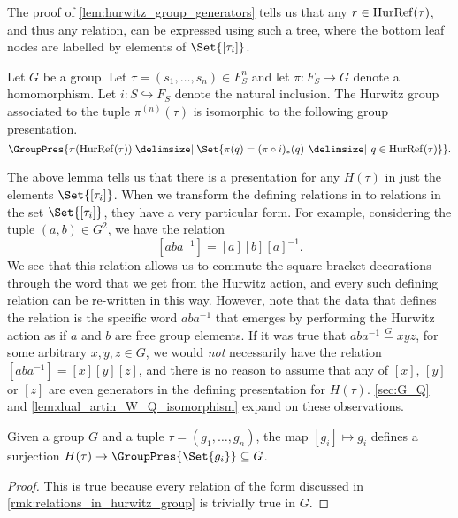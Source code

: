 The proof of \cref{lem:hurwitz_group_generators} tells us that any $r \in \operatorname{HurRef}(\tau)$, and thus any relation, can be expressed using such a tree, where the bottom leaf nodes are labelled by elements of  $\Set{[\tau_i]}$.

\begin{lemma}
	\label{lem:hurwitz_group_alt_presentation}
	Let $G$ be a group.
	Let $\tau = (s_1,\ldots,s_n) \in F_S^n$ and let $\pi \colon F_S \to G$ denote a homomorphism.
	Let $i \colon S \hookrightarrow F_S$ denote the natural inclusion.
	The Hurwitz group associated to the tuple $\pi^{(n)}(\tau)$ is isomorphic to the following group presentation.
	\[
		\GroupPres{\pi(\hurref(\tau)) \relations \Set{\pi(q) = (\pi \circ i)_*(q) \given q \in \hurref(\tau)}}
		.\]
\end{lemma}


\begin{remark}
	\label{rmk:relations_in_hurwitz_group}
	The above lemma tells us that there is a presentation for any $H(\tau)$ in just the elements $\Set{[\tau_i]} $.
	When we transform the defining relations in to relations in the set $\Set{[\tau_i]} $, they have a very particular form.
	For example, considering the tuple $(a,b) \in G^2$, we have the relation
	\[
		[aba^{-1}]=[a][b][a]^{-1}
		.\]
	We see that this relation allows us to commute the square bracket decorations through the word that we get from the Hurwitz action, and every such defining relation can be re-written in this way.
	However, note that the data that defines the relation is the specific word $aba^{-1}$ that emerges by performing the Hurwitz action as if $a$ and $b$ are free group elements.
	If it was true that $aba^{-1} \stackrel{G}{=} xyz$, for some arbitrary $x,y,z \in G$, we would \emph{not} necessarily have the relation $[aba^{-1}]=[x][y][z]$, and there is no reason to assume that any of $[x]$, $[y]$ or $[z]$ are even generators in the defining presentation for $H(\tau)$.
	\cref{sec:G_Q} and \cref{lem:dual_artin_W_Q_isomorphism} expand on these observations.
\end{remark}

\begin{lemma}
	\label{lem:hurwitz_to_G_homomorphism}
	Given a group $G$ and a tuple $\tau = (g_1,\ldots,g_n)$, the map $[g_i] \mapsto g_i$ defines a surjection $H(\tau) \to \GroupPres{\Set{g_i}} \subseteq  G$.
\end{lemma}
\begin{proof}
	This is true because every relation of the form discussed in \cref{rmk:relations_in_hurwitz_group} is trivially true in  $G$.
\end{proof}


